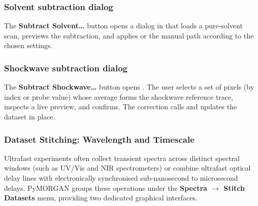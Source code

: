 \subsubsection{Solvent subtraction dialog}

The \textbf{Subtract Solvent\ldots} button opens a dialog in
 that loads a pure-solvent scan, previews the subtraction,
and applies  or the manual 
path according to the chosen settings.

\subsubsection{Shockwave subtraction dialog}

The \textbf{Subtract Shockwave\ldots} button opens
. The user selects a set of pixels (by index or
probe value) whose average forms the shockwave reference trace, inspects a
live preview, and confirms. The correction calls 
and updates the dataset in place.

\subsubsection{Dataset Stitching: Wavelength and Timescale}\label{sec:oneD:stitching}

Ultrafast experiments often collect transient spectra across distinct spectral windows (such as UV/Vis and NIR spectrometers) or combine ultrafast optical delay lines with electronically synchronised sub-nanosecond to microsecond delays. PyMORGAN groups these operations under the \textbf{Spectra $\to$ Stitch Datasets} menu, providing two dedicated graphical interfaces.

